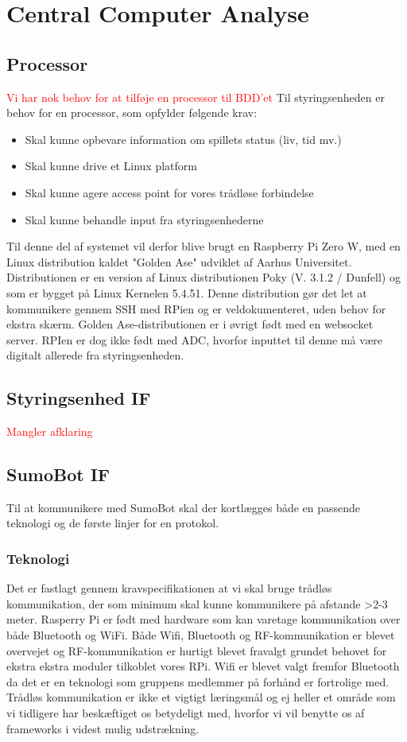 \section{Central Computer Analyse}

\subsection{Processor}
\textcolor{red}{Vi har nok behov for at tilføje en processor til BDD'et}
Til styringsenheden er behov for en processor, som opfylder følgende krav: 
\begin{itemize}
\item Skal kunne opbevare information om spillets status (liv, tid mv.) 
\item Skal kunne drive et Linux platform
\item Skal kunne agere access point for vores trådløse forbindelse 
\item Skal kunne behandle input fra styringsenhederne
\end{itemize}

Til denne del af systemet vil derfor blive brugt en Raspberry Pi Zero W, med en Linux distribution kaldet "Golden Ase" udviklet af Aarhus Universitet. Distributionen er en version af Linux distributionen Poky (V. 3.1.2 / Dunfell) og som er bygget på Linux Kernelen 5.4.51. Denne distribution gør det let at kommunikere gennem SSH med RPien og er veldokumenteret, uden behov for ekstra skærm. Golden Ase-distributionen er i øvrigt født med en websocket server. 
RPIen er dog ikke født med ADC, hvorfor inputtet til denne må være digitalt allerede fra styringsenheden. 

\subsection{Styringsenhed IF}
\textcolor{red}{Mangler afklaring}

\subsection{SumoBot IF}
Til at kommunikere med SumoBot skal der kortlægges både en passende teknologi og de første linjer for en protokol. 

\subsubsection{Teknologi}
Det er fastlagt gennem kravspecifikationen at vi skal bruge trådløs kommunikation, der som minimum skal kunne kommunikere på afstande >2-3 meter. Rasperry Pi er født med hardware som kan varetage kommunikation over både Bluetooth og WiFi. 
Både Wifi, Bluetooth og RF-kommunikation er blevet overvejet og RF-kommunikation er hurtigt blevet fravalgt grundet behovet for ekstra ekstra moduler tilkoblet vores RPi. Wifi er blevet valgt fremfor Bluetooth da det er en teknologi som gruppens medlemmer på forhånd er fortrolige med. Trådløs kommunikation er ikke et vigtigt læringsmål og ej heller et område som vi tidligere har beskæftiget os betydeligt med, hvorfor vi vil benytte os af frameworks i videst mulig udstrækning. 

